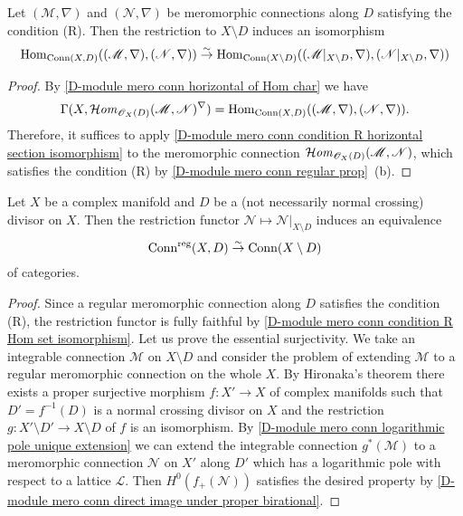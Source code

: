 \begin{lemma}\label{D-module mero conn condition R Hom set isomorphism}
Let $(\mathscr{M},\nabla)$ and $(\mathscr{N},\nabla)$ be meromorphic connections along $D$ satisfying the condition (R). Then the restriction to $X\setminus D$ induces an isomorphism
\[\mathrm{Hom}_{\mathrm{Conn}(X,D)}((\mathscr{M},\nabla),(\mathscr{N},\nabla))\stackrel{\sim}{\to} \mathrm{Hom}_{\mathrm{Conn}(X\setminus D)}((\mathscr{M}|_{X\setminus D},\nabla),(\mathscr{N}|_{X\setminus D},\nabla))\]
\end{lemma}
\begin{proof}
By \cref{D-module mero conn horizontal of Hom char} we have
\[\Gamma(X,\operatorname{\mathcal{H}\hspace*{-0.4pt}\textit{om}\hspace{0.5pt}}_{\mathscr{O}_X(D)}(\mathscr{M},\mathscr{N})^\nabla)=\mathrm{Hom}_{\mathrm{Conn}(X,D)}((\mathscr{M},\nabla),(\mathscr{N},\nabla)).\]
Therefore, it suffices to apply \cref{D-module mero conn condition R horizontal section isomorphism} to the meromorphic connection $\operatorname{\mathcal{H}\hspace*{-0.4pt}\textit{om}\hspace{0.5pt}}_{\mathscr{O}_X(D)}(\mathscr{M},\mathscr{N})$, which satisfies the condition (R) by \cref{D-module mero conn regular prop}~(b).
\end{proof}

\begin{theorem}\label{D-module mero conn Deligne correspondence}
Let $X$ be a complex manifold and $D$ be a (not necessarily normal crossing) divisor on $X$. Then the restriction functor $\mathscr{N}\mapsto\mathscr{N}|_{X\setminus D}$ induces an equivalence
\[\mathrm{Conn}^{\mathrm{reg}}(X,D)\stackrel{\sim}{\to} \mathrm{Conn}(X\setminus D)\]
of categories.
\end{theorem}
\begin{proof}
Since a regular meromorphic connection along $D$ satisfies the condition (R), the restriction functor is fully faithful by \cref{D-module mero conn condition R Hom set isomorphism}. Let us prove the essential surjectivity. We take an integrable connection $\mathscr{M}$ on $X\setminus D$ and consider the problem of extending $\mathscr{M}$ to a regular meromorphic connection on the whole $X$. By Hironaka's theorem there exists a proper surjective morphism $f:X'\to X$ of complex manifolds such that $D'=f^{-1}(D)$ is a normal crossing divisor on $X$ and the restriction $g:X'\setminus D'\to X\setminus D$ of $f$ is an isomorphism. By \cref{D-module mero conn logarithmic pole unique extension} we can extend the integrable connection $g^*(\mathscr{M})$ to a meromorphic connection $\mathscr{N}$ on $X'$ along $D'$ which has a logarithmic pole with respect to a lattice $\mathscr{L}$. Then $H^0(f_+(\mathscr{N}))$ satisfies the desired property by \cref{D-module mero conn direct image under proper birational}.
\end{proof}


